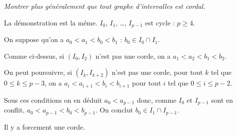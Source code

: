 \begin{Exercise}[title = Cordalité des graphes d'intervalles]\it
Montrer plus généralement que tout graphe d'intervalles est cordal.
\end{Exercise}  
\begin{Answer} La démonstration est la même. $I_0$, $I_1$, \ldots, $I_{p-1}$ est cycle : $p\ge 4$.

On suppose qu'on a $a_0 < a_1 < b_0 < b_1$ : $b_0\in I_0\cap I_1$.

Comme ci-dessus, si $(I_0, I_2)$ n'est pas une corde, on a $a_1< a_2< b_1< b_2$.

On peut poursuivre, si $(I_k, I_{k+2})$ n'est pas une corde, pour tout $k$ tel que $0\le k \le p-3$, on a 
$a_i<a_{i+1} < b_i < b_{i+1}$ pour tout $i$ tel que $0\le i \le p-2$.

Sous ces conditions on en déduit $a_0<a_{p-1}$ donc, comme $I_0$ et $I_{p-1}$ sont en conflit, $a_0<a_{p-1} < b_0 < b_{p-1}$. On conclut $b_0\in I_1\cap I_{p-1}$.

Il y a forcement une corde.
\end{Answer}
